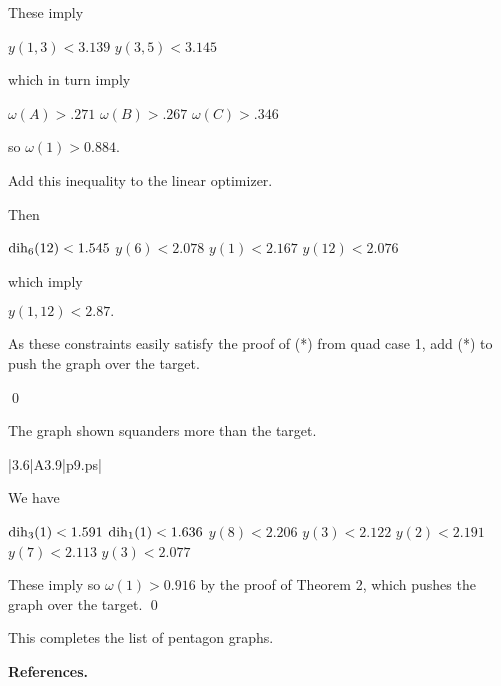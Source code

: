 These imply 

$y(1,3)<3.139$ \newline
$y(3,5)<3.145$ \newline

which in turn imply

$\omega(A)>.271$ \newline
$\omega(B)>.267$ \newline
$\omega(C)>.346$ \newline

so $\omega(1)>0.884$.

Add this inequality to the linear optimizer.

Then

$\operatorname{dih}_6(12)<1.545$ \newline
$y(6)<2.078$ \newline
$y(1)<2.167$ \newline
$y(12)<2.076$ \newline

which imply

$y(1,12)<2.87.$ \newline

As these constraints easily satisfy the proof of (*) from
quad case 1, add (*) to push the graph over the target.

\qed

\bigskip

 The graph shown 
squanders more than the target.  \endproclaim

\gram|3.6|A3.9|p9.ps|  %


We have 

$\operatorname{dih}_3(1) < 1.591$ \newline
$\operatorname{dih}_1(1) < 1.636$ \newline
$y(8)<2.206$ \newline
$y(3)<2.122$ \newline
$y(2)<2.191$ \newline
$y(7)<2.113$ \newline
$y(3)<2.077$ \newline

These imply 
so $\omega(1)>0.916$ by the proof of Theorem 2, which pushes the graph over the target. \qed

\bigskip

This completes the list of pentagon graphs.


\bigskip



{\bf References.}

